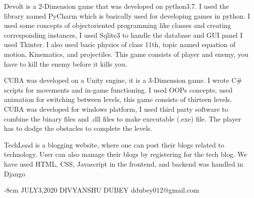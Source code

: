 \documentclass[10pt,a4paper]{altacv}
\begin{document}
{
 Devolt is a 2-Dimension game that was developed on python3.7. I
used the library named PyCharm which is basically used for
developing games in python. I used some concepts of objectoriented programming like classes and creating corresponding
instances, I used Sqlite3 to handle the database and GUI panel I
used Tkinter. I also used basic physics of class 11th, topic named
equation of motion, Kinematics, and projectiles. This game consists
of player and enemy, you have to kill the enemy before it kills you.
}

\divider
{}
{
CUBA was developed on a Unity engine, it is a 3-Dimension game. I
wrote C\# scripts for movements and in-game functioning. I used
OOP\textquotesingle s concepts, used animation for switching between levels, this
game consists of thirteen levels. CUBA was developed for windows
platform, I used third party software to combine the binary files
and .dll files to make executable (.exe) file. The player has to dodge
the obstacles to complete the levels.
}

\divider

{
TechLoad is a blogging website, where one can post their blogs
related to technology. User can also manage their blogs by
registering for the tech blog. We have used HTML, CSS, Javascript
in the frontend, and backend was handled in Django
}
\divider

\begin{adjustwidth}{}{-8cm}
\vspace{15em}
{\faCalendar\hspace{.5em}}{JULY3,2020 }{\hspace{13em}DIVYANSHU DUBEY }{\hspace{12em} {\mailsymbol\hspace{.5em}}ddubey012@gmail.com}
\end{adjustwidth}
\end{document}
